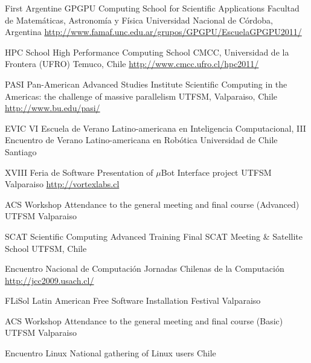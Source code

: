 \documentclass[11pt,a4paper]{moderncv}
\begin{document}
        {First Argentine GPGPU Computing School for Scientific Applications}
        {Facultad de Matemáticas, Astronomía y Física}
        {Universidad Nacional de Córdoba, Argentina}
        {\url{http://www.famaf.unc.edu.ar/grupos/GPGPU/EscuelaGPGPU2011/}}
        {}

        {HPC School}
        {High Performance Computing School}
        {CMCC, Universidad de la Frontera (UFRO)}
        {Temuco, Chile}
        {\url{http://www.cmcc.ufro.cl/hpc2011/}}

        {PASI}
        {Pan-American Advanced Studies Institute}
        {Scientific Computing in the Americas: the challenge of massive parallelism}
        {UTFSM, Valparaiso, Chile}
        {\url{http://www.bu.edu/pasi/}}

        {EVIC}
        {VI Escuela de Verano Latino-americana en Inteligencia Computacional, %
        III Encuentro de Verano Latino-americana en Robótica}
        {Universidad de Chile}
        {Santiago}
        {}

        {XVIII Feria de Software}
        {Presentation of $\mu$Bot Interface project}
        {UTFSM}
        {Valparaiso}
        {\url{http://vortexlabs.cl}}

        {ACS Workshop}
        {Attendance to the general meeting and final course (Advanced)}
        {UTFSM}
        {Valparaiso}
        {}

        {SCAT}
        {Scientific Computing Advanced Training}
        {Final SCAT Meeting \& Satellite School}
        {UTFSM, Chile}
        {}

        {Encuentro Nacional de Computación}
        {Jornadas Chilenas de la Computación}
        {}
        {}
        {\url{http://jcc2009.usach.cl/}}

        {FLiSol}
        {Latin American Free Software Installation Festival}
        {Valparaiso}
        {}
        {}

        {ACS Workshop}
        {Attendance to the general meeting and final course (Basic)}
        {UTFSM}
        {Valparaiso}
        {}

        {Encuentro Linux}
        {National gathering of Linux users}
        {Chile}
        {}
        {}

\end{document}
